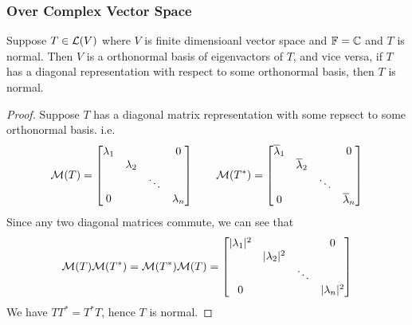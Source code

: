 \subsubsection*{Over Complex Vector Space}
\begin{theorem}
	Suppose $T \in \mathcal L(V)$ where $V$ is finite dimensioanl vector space and $\mathbb F = \mathbb C$ and $T$ is normal. Then $V$ is a orthonormal basis of eigenvactors of $T$, and vice versa,  if $T$ has a diagonal representation with respect to some orthonormal basis, then $T$ is normal.
\end{theorem}
\begin{proof}
	Suppose $T$ has a diagonal matrix representation with some repsect to some orthonormal basis. i.e. 
	\[ \mathcal M(T) = \begin{bmatrix}
		\lambda_1 & & & 0 \\
		& \lambda_2 \\
		& & \ddots \\
		0& & & \lambda_n 
	\end{bmatrix}\qquad \mathcal M(T^*) = \begin{bmatrix}
		\overline \lambda_1 & & & 0 \\
		& \overline \lambda_2 \\
		& & \ddots \\
		0& & & \overline \lambda_n 
	\end{bmatrix}\]
	Since any two diagonal matrices commute, we can see that 
	\[ \mathcal M(T) \mathcal M(T^*) = \mathcal M(T^*) \mathcal M(T) =  \begin{bmatrix}
		|\lambda_1|^2 & & & 0 \\
		& |\lambda_2|^2 \\
		& & \ddots \\
		0& & & |\lambda_n|^2 
	\end{bmatrix}\]
	We have $TT^* = T^*T$, hence $T$ is normal.


\end{proof}
